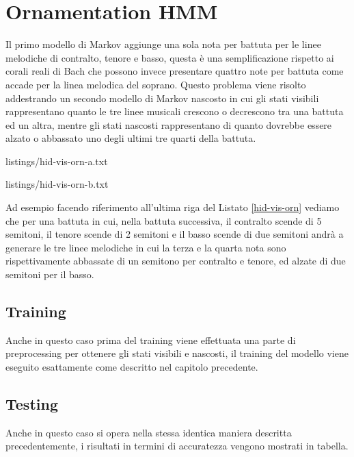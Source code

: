 \chapter{Ornamentation HMM}\label{ch:hmm-ornamentation}
Il primo modello di Markov aggiunge una sola nota per battuta per le linee melodiche di contralto, tenore e basso, questa è una semplificazione rispetto ai corali reali di Bach che possono invece presentare quattro note per battuta come accade per la linea melodica del soprano. Questo problema viene risolto addestrando un secondo modello di Markov nascosto in cui gli stati visibili rappresentano quanto le tre linee musicali crescono o decrescono tra una battuta ed un altra, mentre gli stati nascosti rappresentano di quanto dovrebbe essere alzato o abbassato uno degli ultimi tre quarti della battuta.
\begin{center}
	\begin{minipage}[h]{.45\textwidth}
		
		{listings/hid-vis-orn-a.txt}
	\end{minipage}
	\hspace{.5cm}
	\begin{minipage}[h]{.45\textwidth}
		
		{listings/hid-vis-orn-b.txt}
	\end{minipage}
	\label{hid-vis-orn}
\end{center}
\noindent
Ad esempio facendo riferimento all'ultima riga del Listato \ref{hid-vis-orn} vediamo che per una battuta in cui, nella battuta successiva, il contralto scende di 5 semitoni, il tenore scende di 2 semitoni e il basso scende di due semitoni andrà a generare le tre linee melodiche in cui la terza e la quarta nota sono rispettivamente abbassate di un semitono per contralto e tenore, ed alzate di due semitoni per il basso.
\section{Training}
Anche in questo caso prima del training viene effettuata una parte di preprocessing per ottenere gli stati visibili e nascosti, il training del modello viene eseguito esattamente come descritto nel capitolo precedente.
\section{Testing}
Anche in questo caso si opera nella stessa identica maniera descritta precedentemente, i risultati in termini di accuratezza vengono mostrati in tabella.
